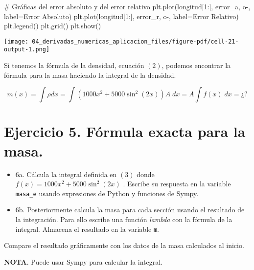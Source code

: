 \documentclass[
  letterpaper,
  DIV=11,
  numbers=noendperiod]{scrreprt}
\newenvironment{Shaded}{\begin{snugshade}}{\end{snugshade}}
\newcommand{\CommentTok}[1]{\textcolor[rgb]{0.37,0.37,0.37}{#1}}
\newcommand{\DecValTok}[1]{\textcolor[rgb]{0.68,0.00,0.00}{#1}}
\newcommand{\NormalTok}[1]{\textcolor[rgb]{0.00,0.23,0.31}{#1}}
\newcommand{\OperatorTok}[1]{\textcolor[rgb]{0.37,0.37,0.37}{#1}}
\newcommand{\StringTok}[1]{\textcolor[rgb]{0.13,0.47,0.30}{#1}}
\providecommand{\tightlist}{%
  \setlength{\itemsep}{0pt}\setlength{\parskip}{0pt}}\usepackage{longtable,booktabs,array}
\begin{document}
\begin{Shaded}
\begin{Highlighting}[]
\CommentTok{\# Gráficas del error absoluto y del error relativo}
\NormalTok{plt.plot(longitud[}\DecValTok{1}\NormalTok{:], error\_a, }\StringTok{\textquotesingle{}o{-}\textquotesingle{}}\NormalTok{, label}\OperatorTok{=}\StringTok{\textquotesingle{}Error Absoluto\textquotesingle{}}\NormalTok{)}
\NormalTok{plt.plot(longitud[}\DecValTok{1}\NormalTok{:], error\_r, }\StringTok{\textquotesingle{}o{-}\textquotesingle{}}\NormalTok{, label}\OperatorTok{=}\StringTok{\textquotesingle{}Error Relativo\textquotesingle{}}\NormalTok{)}
\NormalTok{plt.legend()}
\NormalTok{plt.grid()}
\NormalTok{plt.show()}
\end{Highlighting}
\end{Shaded}

\texttt{[image: 04\_derivadas\_numericas\_aplicacion\_files/figure-pdf/cell-21-output-1.png]}

Si tenemos la fórmula de la densidad, ecuación \((2)\), podemos
encontrar la fórmula para la masa haciendo la integral de la densidad.

\[
m(x) = \int \rho dx = \int (1000 x^2 + 5000 \sin^2(2x)) A \; dx = A \int f(x) \; dx = ¿? \tag{3}
\]

\section{Ejercicio 5. Fórmula exacta para la
masa.}\label{ejercicio-5.-fuxf3rmula-exacta-para-la-masa.}

\begin{itemize}
\tightlist
\item
  6a. Cálcula la integral definida en \((3)\) donde
  \(f(x) = 1000 x^2 + 5000 \sin^2(2x)\) . Escribe su respuesta en la
  variable \texttt{masa\_e} usando expresiones de Python y funciones de
  Sympy.
\item
  6b. Posteriormente calcula la masa para cada sección usando el
  resultado de la integración. Para ello escribe una función
  \emph{lambda} con la fórmula de la integral. Almacena el resultado en
  la variable \texttt{m}.
\end{itemize}

Compare el resultado gráficamente con los datos de la masa calculados al
inicio.

\textbf{NOTA}. Puede usar Sympy para calcular la integral.
\end{document}
